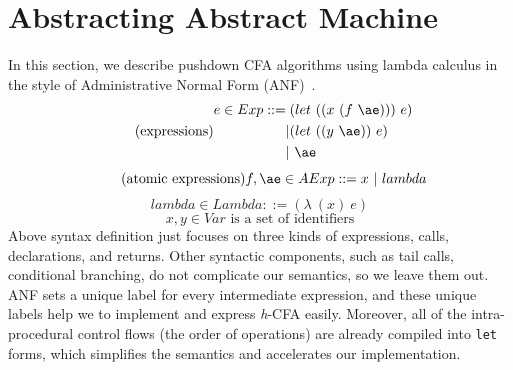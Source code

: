 \documentclass[12pt]{report}
\begin{document}
\section{Abstracting Abstract Machine}
\label{subs:Abstracting Abstract Machine}
In this section, we describe pushdown CFA algorithms using
lambda calculus in the style of Administrative Normal Form (ANF)~\cite{flanagan1993essence}.
\[
\tag{expressions}
\begin{aligned}
\label{eq:bnf}
e \in Exp ::= {}& (let\ ((x\ (f\ \ae)))\ e) {} \\
| & (let\ ((y\ \ae))\ e) {}\\
| & \ \ae
\end{aligned}
\]
\[
\tag{atomic expressions}
f, \ae \in AExp ::= x\ |\ lambda
\]
\[
\tag{lambda abstractions}
lambda \in Lambda ::= (\lambda\ (x)\ e)
\]
\[
\tag{variables}
x,y \in Var \mbox{ is a set of identifiers}
\]
Above syntax definition just focuses on three kinds of expressions, calls, declarations, and returns.
Other syntactic components, such as tail calls, conditional branching, do not complicate our semantics, so we leave them out.
ANF sets a unique label for every intermediate expression, and these unique labels help we to implement and express \textit{h}-CFA easily.
Moreover, all of the intra-procedural control flows (the order of operations) are already compiled into \verb|let| forms, which simplifies the semantics and accelerates our implementation.
\end{document}
